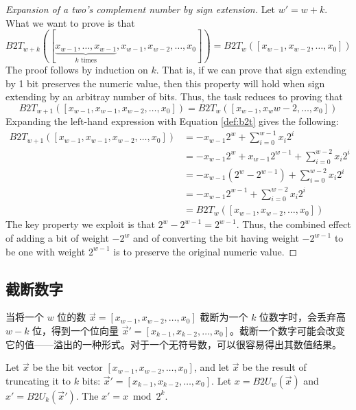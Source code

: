 \begin{proof}[Expansion of a two's complement number by sign extension]
    Let $w' = w + k$. What we want to prove is that
    \[
        B2T_{w+k}([\underbrace{x_{w-1}, \dots, x_{w-1}}_\text{$k$ times}, x_{w-1}, x_{w-2}, \dots, x_0]) = B2T_w([x_{w-1}, x_{w-2}, \dots, x_0])
    \]
    The proof follows by induction on $k$. That is, if we can prove that sign extending by 1 bit preserves the numeric value, then this property will hold when sign extending by an arbitray number of bits. Thus, the task reduces to proving that
    \[
        B2T_{w+1}([x_{w-1}, x_{w-1}, x_{w-2}, \dots, x_0]) = B2T_w([x_{w-1}, x_w{w-2}, \dots, x_0])
    \]
    Expanding the left-hand expression with Equation \eqref{def:b2t} gives the following:
    \begin{align*}
        B2T_{w+1}([x_{w-1}, x_{w-1}, x_{w-2}, \dots, x_0]) & = -x_{w-1}2^w + \sum\limits_{i=0}^{w-1}x_i2^i \\
        & = -x_{w-1}2^w + x_{w-1}2^{w-1} + \sum\limits_{i=0}^{w-2}x_i2^i \\
        & = -x_{w-1}(2^w - 2^{w-1}) + \sum\limits_{i=0}^{w-2}x_i2^i \\
        & = -x_{w-1}2^{w-1} + \sum\limits_{i=0}^{w-2}x_i2^i \\
        & = B2T_w([x_{w-1}, x_{w-2}, \dots, x_0])
    \end{align*}
    The key property we exploit is that $2^w - 2^{w-1} = 2^{w-1}$. Thus, the combined effect
    of adding a bit of weight $-2^w$ and of converting the bit having weight $-2^{w-1}$ to be
    one with weight $2^{w-1}$ is to preserve the original numeric value.
\end{proof}

\subsection{截断数字}

当将一个 $w$ 位的数 $\vec{x} = [x_{w-1}, x_{w-2}, \dots, x_0]$ 截断为一个 $k$ 位数字时，会丢弃高 $w-k$ 位，得到一个位向量 $\vec{x}' = [x_{k-1}, x_{k-2}, \dots, x_0]$。截断一个数字可能会改变它的值——溢出的一种形式。对于一个无符号数，可以很容易得出其数值结果。

\begin{theorem}
    Let $\vec{x}$ be the bit vector $[x_{w-1}, x_{w-2}, \dots, x_0]$, and let $\vec{x}$ be the result of truncating it to $k$ bits: $\vec{x}' = [x_{k-1}, x_{k-2}, \dots, x_0]$. Let $x = B2U_w(\vec{x})$ and $x' = B2U_k(\vec{x}')$. The $x' = x \bmod 2^k$.
\end{theorem}

